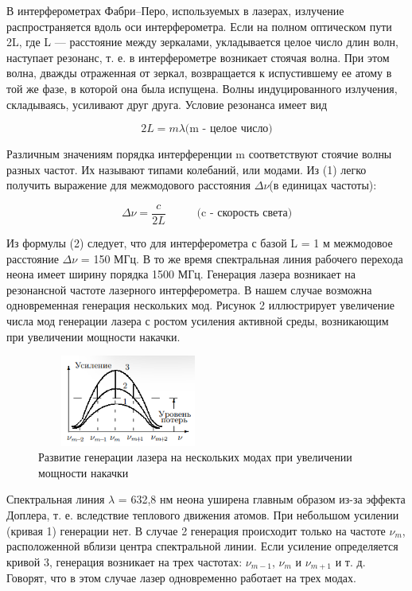 \documentclass[12pt,a4paper]{article}
\begin{document}
\par В интерферометрах Фабри–Перо, используемых в лазерах, излучение распространяется вдоль оси интерферометра. Если на полном оптическом пути 2L, где L — расстояние между зеркалами, укладывается целое число длин волн, наступает резонанс, т. е. в интерферометре возникает стоячая волна. При этом волна, дважды отраженная от зеркал, возвращается к испустившему ее атому в той же фазе, в которой она была испущена. Волны индуцированного излучения, складываясь, усиливают друг друга. Условие резонанса имеет вид

\begin{equation}
2L = m\lambda \text{(m - целое число)}
\end{equation}

\par Различным значениям порядка интерференции m соответствуют стоячие волны разных частот. Их называют типами колебаний, или модами. Из (1) легко получить выражение для межмодового расстояния $\Delta\nu$(в единицах частоты):

\begin{equation}
\Delta\nu = \frac{c}{2L} \;\;\;\;\;\;\;\;\;\; \text{(c - скорость света)}
\end{equation}

\par Из формулы (2) следует, что для интерферометра с базой L = 1 м межмодовое расстояние $\Delta\nu$ = 150 МГц. В то же время спектральная линия рабочего перехода неона имеет ширину порядка 1500 МГц. Генерация лазера возникает на резонансной частоте лазерного интерферометра. В нашем случае возможна одновременная генерация нескольких мод. Рисунок 2 иллюстрирует увеличение числа мод генерации лазера с ростом усиления активной среды, возникающим при увеличении мощности накачки. 

\begin{figure}
	\vspace{-4ex}
	\includegraphics[width=6cm, height=3cm]{4.5.3-2}
	\caption{Развитие генерации лазера на нескольких модах при увеличении мощности накачки}
\end{figure}	 

\par Спектральная линия $\lambda$ = 632,8 нм неона уширена главным образом из-за эффекта Доплера, т. е. вследствие теплового движения атомов. При небольшом
усилении (кривая 1) генерации нет. В случае 2 генерация происходит только на частоте $\nu_m$, расположенной вблизи центра спектральной линии. Если усиление определяется кривой 3, генерация возникает на трех частотах: $\nu_{m-1}$, $\nu_{m}$ и $\nu_{m+1}$ и т. д. Говорят, что в этом случае лазер одновременно работает на трех модах.
\end{document}
